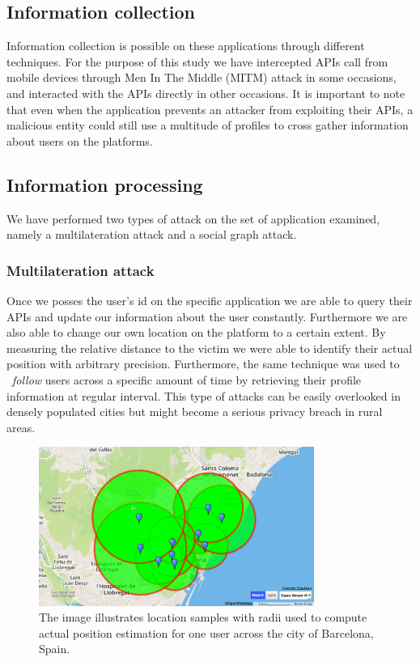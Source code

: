 \subsection{Information collection}
\noindent
Information collection is possible on these applications through different techniques. For the purpose of this study we have intercepted APIs call from mobile devices through Men In The Middle (MITM) attack in some occasions, and interacted with the APIs directly in other occasions.
\noindent
It is important to note that even when the application prevents an attacker from exploiting their APIs, a malicious entity could still use a multitude of profiles to cross gather information about users on the platforms.

\subsection{Information processing}
\noindent
We have performed two types of attack on the set of application examined, namely a multilateration attack and a social graph attack.

\subsubsection{Multilateration attack}
\noindent
Once we posses the user's id on the specific application we are able to query their APIs and update our information about the user constantly. Furthermore we are also able to change our own location on the platform to a certain extent.
\noindent
By measuring the relative distance to the victim we were able to identify their actual position with arbitrary precision. Furthermore, the same technique was used to ~\emph{follow} users across a specific amount of time by retrieving their profile information at regular interval.
\noindent
This type of attacks can be easily overlooked in densely populated cities but might become a serious privacy breach in rural areas.

\begin{figure}[t]
\centering
\includegraphics[width=90mm]{figures/user_mlat.jpg}
\caption[Location samples for a single user.]{The image illustrates location samples with radii used to compute actual position estimation for one user across the city of Barcelona, Spain.}
\label{fig:mlat}
\end{figure}

